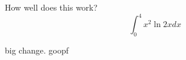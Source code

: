 \documentclass{article}
\begin{document}
How well does this work?
$$\int_0^4 x^2 \ln{2x}dx$$

big change. goopf
\end{document}
